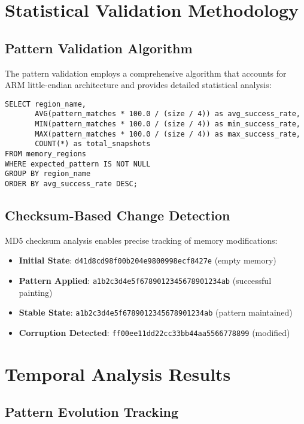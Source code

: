 \documentclass[11pt,a4paper]{article}
\begin{document}
\section{Statistical Validation Methodology}

\subsection{Pattern Validation Algorithm}

The pattern validation employs a comprehensive algorithm that accounts for ARM little-endian architecture and provides detailed statistical analysis:

\begin{lstlisting}[style=sql, caption=Pattern Validation Database Query]
SELECT region_name, 
       AVG(pattern_matches * 100.0 / (size / 4)) as avg_success_rate,
       MIN(pattern_matches * 100.0 / (size / 4)) as min_success_rate,
       MAX(pattern_matches * 100.0 / (size / 4)) as max_success_rate,
       COUNT(*) as total_snapshots
FROM memory_regions 
WHERE expected_pattern IS NOT NULL
GROUP BY region_name
ORDER BY avg_success_rate DESC;
\end{lstlisting}

\subsection{Checksum-Based Change Detection}

MD5 checksum analysis enables precise tracking of memory modifications:

\begin{itemize}
    \item \textbf{Initial State}: \texttt{d41d8cd98f00b204e9800998ecf8427e} (empty memory)
    \item \textbf{Pattern Applied}: \texttt{a1b2c3d4e5f6789012345678901234ab} (successful painting)
    \item \textbf{Stable State}: \texttt{a1b2c3d4e5f6789012345678901234ab} (pattern maintained)
    \item \textbf{Corruption Detected}: \texttt{ff00ee11dd22cc33bb44aa5566778899} (modified)
\end{itemize}

\section{Temporal Analysis Results}

\subsection{Pattern Evolution Tracking}
\end{document}
